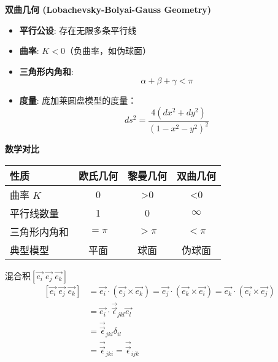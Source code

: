 \documentclass[12pt, a4paper, oneside, UTF8]{ctexbook}  %
\begin{document}
\begin{add}
\centerline{\textbf{双曲几何 (Lobachevsky-Bolyai-Gauss Geometry)}}
\begin{itemize}
    \item \textbf{平行公设}: 存在无限多条平行线
    \item \textbf{曲率}: \( K < 0 \)（负曲率，如伪球面）
    \item \textbf{三角形内角和}: 
    \[
    \alpha + \beta + \gamma < \pi
    \]
    \item \textbf{度量}: 庞加莱圆盘模型的度量：
    \[
    ds^2 = \frac{4(dx^2 + dy^2)}{(1 - x^2 - y^2)^2}
    \]
\end{itemize}

\begin{figure}[ht]
\centering
{}
\end{figure}

\centerline{\textbf{数学对比}}
\begin{center}
    \begin{tabular}{|l|c|c|c|}
    \hline
    \textbf{性质} & \textbf{欧氏几何} & \textbf{黎曼几何} & \textbf{双曲几何} \\
    \hline
    曲率 \( K \) & 0 & >0 & <0 \\
    平行线数量 & 1 & 0 & $\infty$ \\
    三角形内角和 & \( = \pi \) & \( > \pi \) & \( < \pi \) \\
    典型模型 & 平面 & 球面 & 伪球面 \\
    \hline
    \end{tabular}
\end{center}
\end{add}
\begin{defn}
    混合积$\left[\vec{e_i}\;\vec{e_j}\;\vec{e_k}\right]$
\begin{align*}
    \left[\vec{e_i}\;\vec{e_j}\;\vec{e_k}\right]
    &=\vec{e_i}\cdot\left(\vec{e_j}\times\vec{e_k}\right)
    =\vec{e_j}\cdot\left(\vec{e_k}\times\vec{e_i}\right)
    =\vec{e_k}\cdot\left(\vec{e_i}\times\vec{e_j}\right)\\
    &=\vec{e_i}\cdot\vec{\vec{\epsilon}}_{jkl}\vec{e_l}\\
    &=\vec{\vec{\epsilon}}_{jkl}\delta_{il}\\
    &=\vec{\vec{\epsilon}}_{jki}=\vec{\vec{\epsilon}}_{ijk}
\end{align*}
\end{defn}
\end{document}
